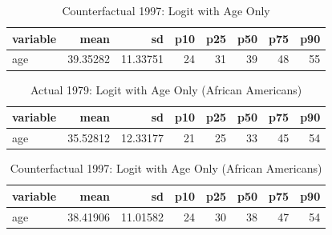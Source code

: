 \documentclass[11pt]{article}
\begin{document}
\begin{table}[H]\centering
	\caption{Counterfactual 1997: Logit with Age Only}{\label{} 
		\textbf{} }\begin{tabular} {@{} l r r r r r r r @{}} \\ \hline
		\textbf{variable } & \textbf{      mean} & \textbf{        sd} & \textbf{       p10} & \textbf{       p25} & \textbf{       p50} & \textbf{       p75} & \textbf{       p90} \\
		\hline
		age  &   39.35282 &   11.33751 &         24 &         31 &         39 &         48 &         55 \\
		\hline
	\end{tabular}
\end{table}


\begin{table}[H]\centering
	\caption{Actual 1979: Logit with Age Only (African Americans)}{\label{} 
		\textbf{} }\begin{tabular} {@{} l r r r r r r r @{}} \\ \hline
		\textbf{variable } & \textbf{      mean} & \textbf{        sd} & \textbf{       p10} &
		\textbf{       p25} & \textbf{       p50} & \textbf{       p75} & \textbf{       p90} \\
		\hline
		age  &   35.52812 &   12.33177 &         21 &         25 &         33 &        
		45 &         54 \\
		\hline
	\end{tabular}
\end{table}

\begin{table}[H]\centering
	\caption{Counterfactual 1997: Logit with Age Only (African Americans)}{\label{} 
		\textbf{} }\begin{tabular} {@{} l r r r r r r r @{}} \\ \hline
		\textbf{variable } & \textbf{      mean} & \textbf{        sd} & \textbf{       p10} &
		\textbf{       p25} & \textbf{       p50} & \textbf{       p75} & \textbf{       p90} \\
		\hline
		age  &   38.41906 &   11.01582 &         24 &         30 &         38 &        
		47 &         54 \\
		\hline
	\end{tabular}
\end{table}
\end{document}
